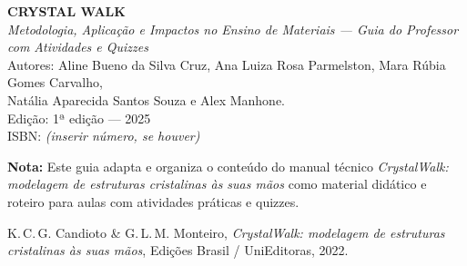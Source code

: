 \documentclass[12pt,openright,oneside]{book} %
\begin{document}

\MakeCover

\cleardoublepage
\thispagestyle{empty}
\vspace*{3cm}
\begin{center}
\small
\textbf{CRYSTAL WALK}\\
{\it Metodologia, Aplicação e Impactos no Ensino de Materiais — Guia do Professor com Atividades e Quizzes}\\[1em]
Autores: Aline Bueno da Silva Cruz, Ana Luiza Rosa Parmelston, Mara Rúbia Gomes Carvalho,\\
Natália Aparecida Santos Souza e Alex Manhone.\\[1em]
Edição: 1ª edição — 2025\\[1em]
ISBN: \textit{(inserir número, se houver)}\\[2em]
\end{center}

\noindent\textbf{Nota:} Este guia adapta e organiza o conteúdo do manual técnico \emph{CrystalWalk: modelagem de estruturas cristalinas às suas mãos} como material didático e roteiro para aulas com atividades práticas e quizzes.

\clearpage

\setcounter{page}{1}
\tableofcontents
\cleardoublepage

\setcounter{page}{1}











\appendix




\cleardoublepage
{}
{}
\begin{thebibliography}{9}
K.\,C.\,G. Candioto \& G.\,L.\,M. Monteiro,
\emph{CrystalWalk: modelagem de estruturas cristalinas às suas mãos},
Edições Brasil / UniEditoras, 2022.
\end{thebibliography}
\end{document}
